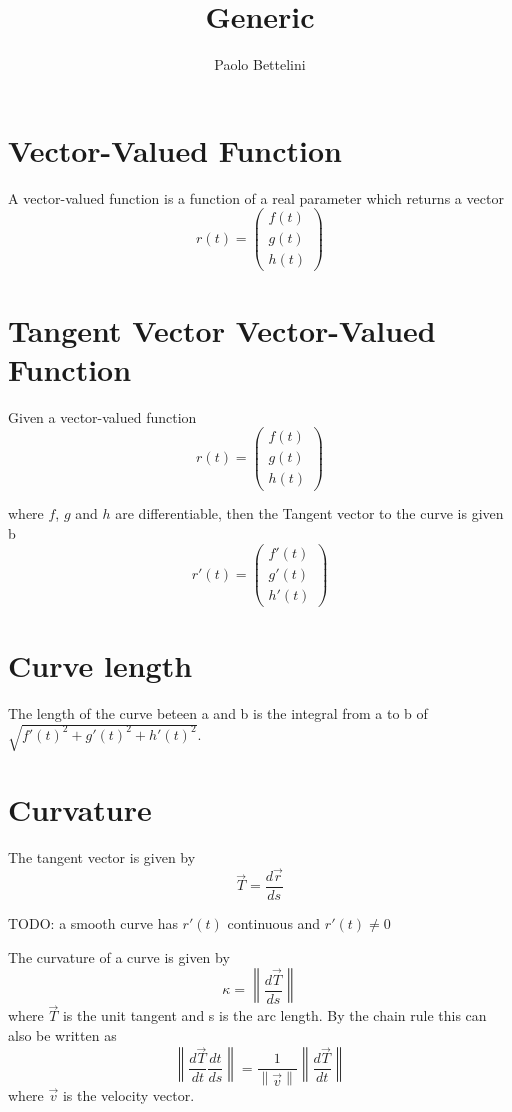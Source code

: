 \documentclass[a4paper]{article}
\title{Generic}
\author{Paolo Bettelini}
\date{}
\begin{document}
\section{Vector-Valued Function}

A vector-valued function is a function of a real parameter
which returns a vector
\[
    r(t) = \begin{pmatrix}
        f(t) \\
        g(t) \\
        h(t)
    \end{pmatrix}
\]

\section{Tangent Vector Vector-Valued Function}

Given a vector-valued function
\[
    r(t) = \begin{pmatrix}
        f(t) \\
        g(t) \\
        h(t)
    \end{pmatrix}
\]

where \(f\), \(g\) and \(h\) are differentiable,
then the Tangent vector to the curve is given b
\[
    r'(t) = \begin{pmatrix}
        f'(t) \\
        g'(t) \\
        h'(t)
    \end{pmatrix}
\]

\section{Curve length}

The length of the curve beteen a and b is the integral from a to b of \(\sqrt{f'(t)^2+g'(t)^2+h'(t)^2}\).

\section{Curvature}

The tangent vector is given by
\[
    \vec{T} = \frac{d\vec{r}}{ds}
\]

TODO: a smooth curve has \(r'(t)\) continuous and \(r'(t) \neq 0\)

\newcommand\norm[1]{\left\lVert#1\right\rVert}
The curvature of a curve is given by
\[
    \kappa = \norm{\frac{d\vec{T}}{ds}}
\]
where \(\vec{T}\) is the unit tangent and s is the arc length.
By the chain rule this can also be written as
\[
    \norm{\frac{d\vec{T}}{dt}\frac{dt}{ds}} = \frac{1}{\norm{\vec{v}}}\norm{\frac{d\vec{T}}{dt}}
\]
where \(\vec{v}\) is the velocity vector.
\end{document}
